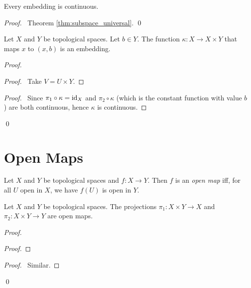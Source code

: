\begin{prop}
Every embedding is continuous.
\end{prop}

\begin{proof}
\pf\ Theorem \ref{thm:subspace_universal}. \qed
\end{proof}

\begin{prop}
Let $X$ and $Y$ be topological spaces. Let $b \in Y$. The function $\kappa : X \rightarrow X \times Y$ that maps $x$ to $(x,b)$ is an embedding.
\end{prop}

\begin{proof}
\pf
{}
\begin{proof}
	\pf\ Take $V = U \times Y$.
\end{proof}
\begin{proof}
	\pf\ Since $\pi_1 \circ \kappa = \mathrm{id}_{X}$ and $\pi_2 \circ \kappa$ (which is the constant function with value $b$) are both continuous, hence $\kappa$ is continuous.
\end{proof}
\qed
\end{proof}

\section{Open Maps}

\begin{df}
Let $X$ and $Y$ be topological spaces and $f : X \rightarrow Y$. Then $f$ is an \emph{open map} iff, for all $U$ open in $X$, we have $f(U)$ is open in $Y$.
\end{df}

\begin{prop}
Let $X$ and $Y$ be topological spaces. The projections $\pi_1 : X \times Y \rightarrow X$ and $\pi_2 : X \times Y \rightarrow Y$ are open maps.
\end{prop}

\begin{proof}
\pf
{}
\begin{proof}
\end{proof}
\begin{proof}
	\pf\ Similar.
\end{proof}
\qed
\end{proof}

